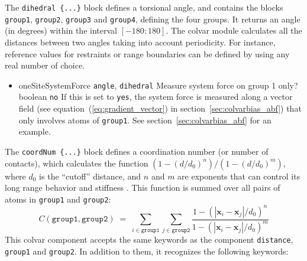 The \texttt{dihedral~\{...\}} block defines a torsional angle, and
contains the blocks \texttt{group1}, \texttt{group2}, \texttt{group3}
and \texttt{group4}, defining the four groups.  It returns an angle
(in degrees) within the interval $[-180:180]$.  The colvar module
calculates all the distances between two angles taking into account
periodicity.  For instance, reference values for restraints or range
boundaries can be defined by using any real number of choice.
\begin{itemize}
\item \keydef
    {oneSiteSystemForce}{%
    \texttt{angle}, \texttt{dihedral}}{%
    Measure system force on group 1 only?}{%
    boolean}{%
    \texttt{no}}{%
    If this is set to \texttt{yes}, the system force is measured along
    a vector field (see equation~(\ref{eq:gradient_vector}) in
    section~\ref{sec:colvarbias_abf}) that only involves atoms of
    \texttt{group1}.  See section~\ref{sec:colvarbias_abf} for an
    example.}
\end{itemize}


The \texttt{coordNum \{...\}} block defines
a coordination number (or number of contacts), which calculates the
function $(1-(d/d_0)^{n})/(1-(d/d_0)^{m})$, where $d_0$ is the
``cutoff'' distance, and $n$ and $m$ are exponents that can control
its long range behavior and stiffness \cite{Iannuzzi2003}.  This
function is summed over all pairs of atoms in \texttt{group1} and
\texttt{group2}:
\begin{equation}
  \label{eq:cvc_coordNum}
  C (\mathtt{group1}, \mathtt{group2}) \; = \; 
  \sum_{i\in\mathtt{group1}}\sum_{j\in\mathtt{group2}} {
    \frac{1 - (|\mathbf{x}_{i}-\mathbf{x}_{j}|/d_{0})^{n}}{
      1 - (|\mathbf{x}_{i}-\mathbf{x}_{j}|/d_{0})^{m} }
  }
\end{equation}
This colvar component accepts the same keywords as the component \texttt{distance},
\texttt{group1} and \texttt{group2}.  In addition to them, it
recognizes the following keywords:

